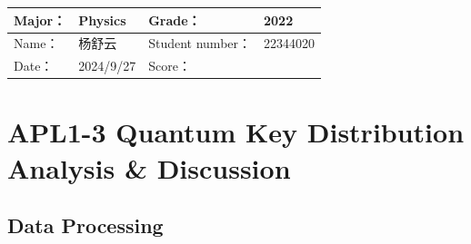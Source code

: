 
\begin{table}
	\renewcommand\arraystretch{1.7}
	\begin{tabularx}{\textwidth}{|X|X|X|X|}
		\hline
		Major：& Physics &Grade：& 2022\\
		\hline
		Name： & 杨舒云 & Student number：& 22344020\\
		\hline
		Date：& 2024/9/27 & Score： &\\
		\hline
	\end{tabularx}
\end{table}
\section{APL1-3 Quantum Key Distribution \\ Analysis \& Discussion}


\subsection{Data Processing}

